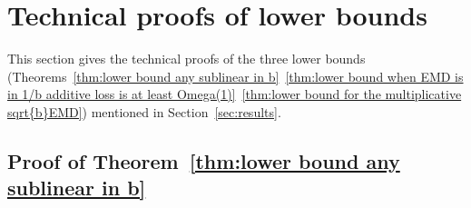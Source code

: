 
\section{Technical proofs of lower bounds}
\label{appendix:proofs of three lower bounds}

This section gives the technical proofs of the three lower bounds (Theorems~\ref{thm:lower bound any sublinear in b}~\ref{thm:lower bound when EMD is in 1/b additive loss is at least Omega(1)}~\ref{thm:lower bound for the multiplicative sqrt{b}EMD}) mentioned in Section~\ref{sec:results}.






\subsection*{Proof of Theorem~\ref{thm:lower bound any sublinear in b}}
\label{appendix:proof_lowerbound_1}
